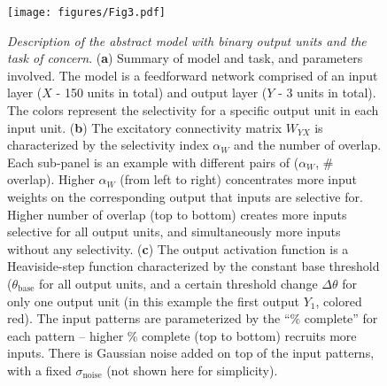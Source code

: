 \begin{figure}[ht]
    \centering
    \texttt{[image: figures/Fig3.pdf]}
    \caption{
    \textit{Description of the abstract model with binary output units and the task of concern}.
    (\textbf{a}) Summary of model and task, and parameters involved.
    The model is a feedforward network comprised of an input layer ($X$ - 150 units in total)
        and output layer ($Y$ - 3 units in total).
    The colors represent the selectivity for a specific output unit in each input unit.
    (\textbf{b}) The excitatory connectivity matrix $W_{YX}$ is characterized by the selectivity index $\alpha_W$ and the number of overlap.
    Each sub-panel is an example with different pairs of ($\alpha_W$, \# overlap).
        Higher $\alpha_W$ (from left to right) concentrates more input weights on the corresponding output that inputs are selective for.
        Higher number of overlap (top to bottom) creates more inputs selective for all output units, and simultaneously more inputs without any selectivity.
    (\textbf{c})
        The output activation function is a Heaviside-step function characterized by
            the constant base threshold ($\theta_{\mathrm{base}}$ for all output units,
            and a certain threshold change $\Delta\theta$ for only one output unit
            (in this example the first output $Y_1$, colored red).
        The input patterns are parameterized by the ``\% complete'' for each pattern -- higher \% complete (top to bottom) recruits more inputs.
        There is Gaussian noise added on top of the input patterns, with a fixed $\sigma_\mathrm{noise}$ (not shown here for simplicity).
    }
    \label{fig:demo-ffwd-recog}
\end{figure}